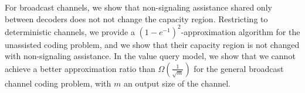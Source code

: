 For broadcast channels, we show that non-signaling assistance shared only between decoders does not not change the capacity region. Restricting to deterministic channels, we provide a $(1-e^{-1})^2$-approximation algorithm for the unassisted coding problem, and we show that their capacity region is not changed with non-signaling assistance. In the value query model, we show that we cannot achieve a better approximation ratio than $\Omega\left(\frac{1}{\sqrt{m}}\right)$ for the general broadcast channel coding problem, with $m$ an output size of the channel.

